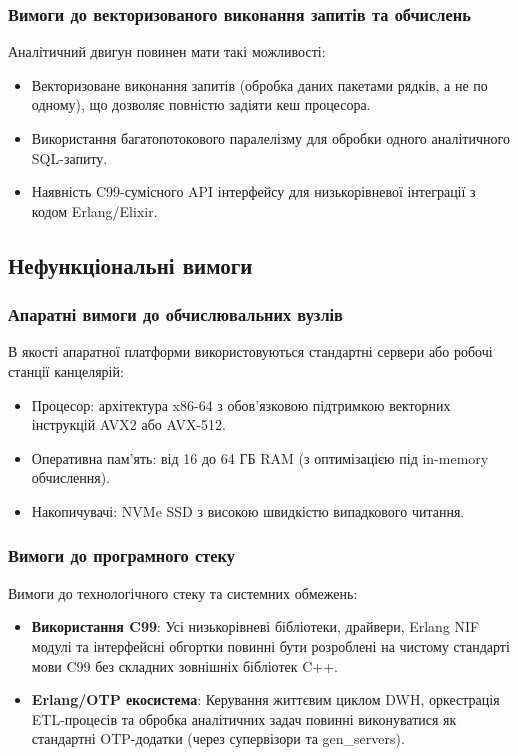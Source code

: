 \documentclass{article}
\begin{document}
\subsubsection{Вимоги до векторизованого виконання запитів та обчислень}
Аналітичний двигун повинен мати такі можливості:
\begin{itemize}
    \item Векторизоване виконання запитів (обробка даних пакетами рядків, а не по одному), що дозволяє повністю задіяти кеш процесора.
    \item Використання багатопотокового паралелізму для обробки одного аналітичного SQL-запиту.
    \item Наявність C99-сумісного API інтерфейсу для низькорівневої інтеграції з кодом Erlang/Elixir.
\end{itemize}

\subsection{Нефункціональні вимоги}

\subsubsection{Апаратні вимоги до обчислювальних вузлів}
В якості апаратної платформи використовуються стандартні сервери або робочі станції канцелярій:
\begin{itemize}
    \item Процесор: архітектура x86-64 з обов'язковою підтримкою векторних інструкцій AVX2 або AVX-512.
    \item Оперативна пам'ять: від 16 до 64 ГБ RAM (з оптимізацією під in-memory обчислення).
    \item Накопичувачі: NVMe SSD з високою швидкістю випадкового читання.
\end{itemize}

\subsubsection{Вимоги до програмного стеку}
Вимоги до технологічного стеку та системних обмежень:
\begin{itemize}
    \item \textbf{Використання C99}: Усі низькорівневі бібліотеки, драйвери, Erlang NIF модулі та інтерфейсні обгортки повинні бути розроблені на чистому стандарті мови C99 без складних зовнішніх бібліотек C++.
    \item \textbf{Erlang/OTP екосистема}: Керування життєвим циклом DWH, оркестрація ETL-процесів та обробка аналітичних задач повинні виконуватися як стандартні OTP-додатки (через супервізори та gen\_servers).
\end{itemize}
\end{document}
